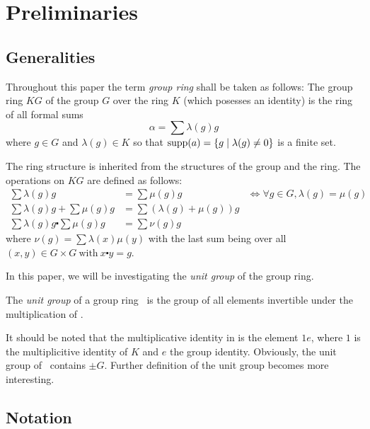 \documentclass[11pt]{report}
\begin{document}
\onehalfspacing %


\tableofcontents
\listoffigures
\listoftables

\bodyoftext 
\chapter{Preliminaries} 
\section{Generalities} 
Throughout this paper the term \emph{group ring} shall be taken as follows: The group ring $KG$ of
the group $G$ over the ring $K$ (which posesses an identity) is the ring of all formal sums
\[\alpha=\sum \lambda(g)g \] where \(g \in G\) and \( \lambda(g) \in K\) so that
 \(\mathrm{supp}(a)= \{g \mid \lambda(g) \neq 0\}\) is a finite set.

The ring structure is inherited from the structures of the group and the ring. The operations on 
\(KG\) are defined as follows:
\begin{align*}
\sum\lambda(g)g &= \sum\mu(g)g &\iff \forall  g \in G, \lambda(g) = \mu(g)\\
\sum \lambda(g)g + \sum \mu(g)g &= \sum(\lambda(g)+\mu(g))g\\
\sum \lambda(g)g \centerdot \sum \mu(g)g &= \sum \nu(g)g
\end{align*}
where \( \nu(g) = \sum \lambda(x)\mu(y) \) with the last sum being over all  \( (x,y) \in  
G\times  G \mathrm{\ with} \  x\centerdot y = g\).

In this paper, we will be investigating the
\emph{unit group} of the group ring. 
\begin{definition}
The \emph{unit group} of a group ring \KG\ is the group of all elements invertible under
the multiplication of \KG. 
\end{definition}

It should be noted that the multiplicative identity in \KG{} is the
element \(1e\), where \(1\) is the multiplicitive identity of \(K\) and
 \(e\) the group identity. Obviously, the unit group of \KG\ contains
 \( \pm G\). Further definition of the unit group becomes more interesting.

\section{Notation}
\end{document}

